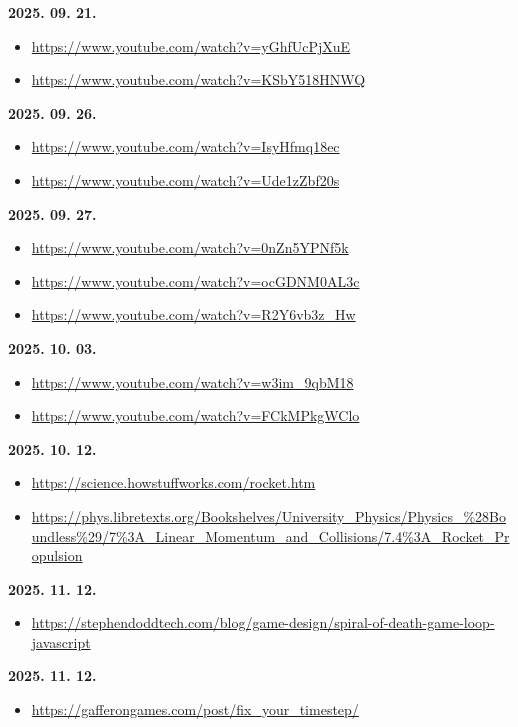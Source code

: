 \documentclass[12pt]{report}
\begin{document}
\noindent\textbf{2025. 09. 21.}
\begin{itemize}[left=0pt, topsep=0pt]
    \item \url{https://www.youtube.com/watch?v=yGhfUcPjXuE}
    \item \url{https://www.youtube.com/watch?v=KSbY518HNWQ}
\end{itemize}

\noindent\textbf{2025. 09. 26.}
\begin{itemize}[left=0pt, topsep=0pt]
    \item \url{https://www.youtube.com/watch?v=IsyHfmq18ec}
    \item \url{https://www.youtube.com/watch?v=Ude1zZbf20s}
\end{itemize}

\noindent\textbf{2025. 09. 27.}
\begin{itemize}[left=0pt, topsep=0pt]
    \item \url{https://www.youtube.com/watch?v=0nZn5YPNf5k}
    \item \url{https://www.youtube.com/watch?v=ocGDNM0AL3c}
    \item \url{https://www.youtube.com/watch?v=R2Y6vb3z_Hw}
\end{itemize}

\noindent\textbf{2025. 10. 03.}
\begin{itemize}[left=0pt, topsep=0pt]
    \item \url{https://www.youtube.com/watch?v=w3im_9qbM18}
    \item \url{https://www.youtube.com/watch?v=FCkMPkgWClo}
\end{itemize}

\noindent\textbf{2025. 10. 12.}
\begin{itemize}[left=0pt, topsep=0pt]
    \item \url{https://science.howstuffworks.com/rocket.htm}
    \item \url{https://phys.libretexts.org/Bookshelves/University_Physics/Physics_%28Boundless%29/7%3A_Linear_Momentum_and_Collisions/7.4%3A_Rocket_Propulsion}
\end{itemize}

\noindent\textbf{2025. 11. 12.}
\begin{itemize}[left=0pt, topsep=0pt]
    \item \url{https://stephendoddtech.com/blog/game-design/spiral-of-death-game-loop-javascript}
\end{itemize}

\noindent\textbf{2025. 11. 12.}
\begin{itemize}[left=0pt, topsep=0pt]
    \item \url{https://gafferongames.com/post/fix_your_timestep/}
\end{itemize}
\end{document}
